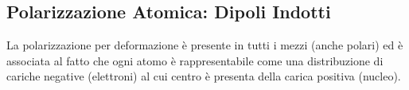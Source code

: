 \begin{center}
\end{center}

\subsection{Polarizzazione Atomica: Dipoli Indotti}

La polarizzazione per deformazione \`e presente in tutti i mezzi (anche polari) ed \`e associata al fatto che ogni atomo \`e rappresentabile come una distribuzione di cariche negative (elettroni) al cui centro \`e presenta della carica positiva (nucleo).

